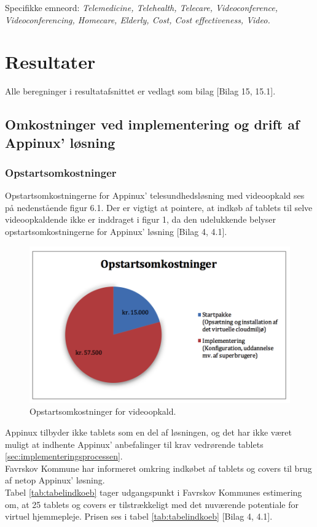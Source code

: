 Specifikke emneord: \textit{Telemedicine, Telehealth, Telecare, Videoconference, Videoconferencing, Homecare, Elderly, Cost, Cost effectiveness, Video.}
  


\section{Resultater}
Alle beregninger i resultatafsnittet er vedlagt som bilag [Bilag 15, 15.1]. 
\subsection{Omkostninger ved implementering og drift af Appinux' løsning}
\subsubsection{Opstartsomkostninger}
Opstartsomkostningerne for Appinux’ telesundhedsløsning med videoopkald ses på nedenstående figur 6.1. Der er vigtigt at pointere, at indkøb af tablets til selve videoopkaldende ikke er inddraget i figur 1, da den udelukkende belyser opstartsomkostningerne for Appinux’ løsning [Bilag 4, 4.1].

\begin{figure}[H]
	\centering
	\includegraphics[width=1\textwidth]{Figurer/Snip20160504_26}
	\caption{Opstartsomkostninger for videoopkald.}
\end{figure}

Appinux tilbyder ikke tablets som en del af løsningen, og det har ikke været muligt at indhente Appinux' anbefalinger til krav vedrørende tablets \vref{sec:implementeringsprocessen}.\\
Favrskov Kommune har informeret omkring indkøbet af tablets og covers til brug af netop Appinux’ løsning. \\
Tabel \ref{tab:tabelindkoeb} tager udgangspunkt i Favrskov Kommunes estimering om, at 25 tablets og covers er tilstrækkeligt med det nuværende potentiale for virtuel hjemmepleje. Prisen ses i tabel \ref{tab:tabelindkoeb} [Bilag 4, 4.1]. 

